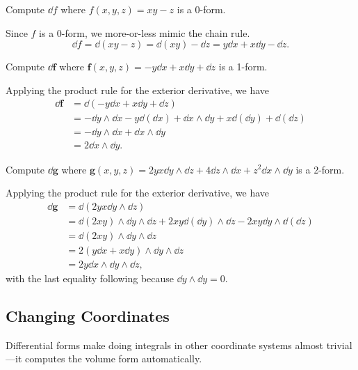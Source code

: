 \begin{example}
	Compute $\dd f$ where $f(x,y,z) = xy-z$ is a 0-form.

	Since $f$ is a 0-form, we more-or-less mimic the chain rule.
	\[
		\dd f = \dd (xy-z) = \dd (xy) -\dd z = y\dd x+x\dd y-\dd z.
	\]
\end{example}
\begin{example}
	Compute $\dd \bm f$ where $\bm f(x,y,z) = -y\dd x+x\dd y +\dd z$ is a 1-form.

	Applying the product rule for the exterior derivative, we have
	\begin{align*}
		\dd \bm f &= \dd(-y\dd x+x\dd y +\dd z) \\
		&= -\dd y\wedge \dd x - y\dd(\dd x) + \dd x\wedge \dd y + x\dd(\dd y) + \dd(\dd z)\\
		&= -\dd y\wedge \dd x+\dd x\wedge \dd y\\
		&= 2\dd x\wedge \dd y.
	\end{align*}
\end{example}
\begin{example}
	Compute $\dd \bm g$ where $\bm g(x,y,z) = 2yx\dd y\wedge \dd z
	+ 4\dd z\wedge \dd x+z^2\dd x\wedge \dd y$ is a 2-form.

	Applying the product rule for the exterior derivative, we have
	\begin{align*}
		\dd \bm g &= \dd(2yx\dd y\wedge \dd z) \\
		&= \dd(2xy)\wedge \dd y\wedge \dd z + 2xy\dd(\dd y)\wedge \dd z -2xy\dd y\wedge \dd(\dd z)\\
		&= \dd(2xy)\wedge \dd y\wedge \dd z\\
		&= 2(y\dd x+x\dd y)\wedge \dd y\wedge \dd z\\
		&= 2y\dd x\wedge \dd y\wedge \dd z,
	\end{align*}
	with the last equality following because $\dd y\wedge \dd y=0$.
\end{example}

\subsection{Changing Coordinates}

Differential forms make doing integrals in other coordinate systems
almost trivial---it computes the volume form automatically.

